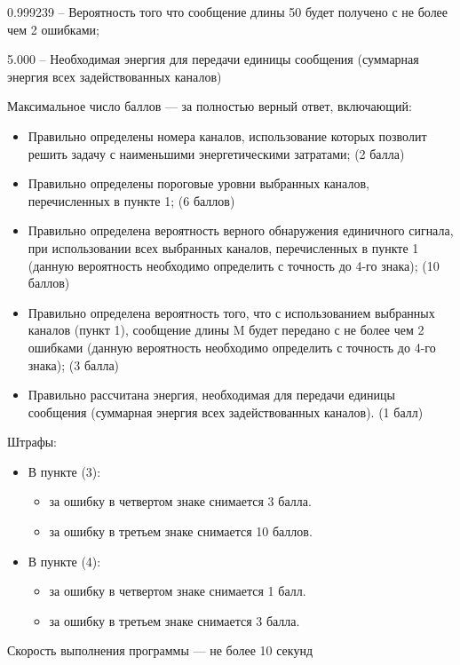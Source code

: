 0.999239 -- Вероятность того что сообщение длины 50 будет получено с не более чем 2 ошибками;

5.000 -- Необходимая энергия для передачи единицы сообщения (суммарная энергия всех задействованных каналов)

\markSection

Максимальное число баллов — за полностью верный ответ, включающий:

\begin{itemize}
    \item Правильно определены номера каналов, использование которых позволит решить задачу с наименьшими энергетическими затратами; (2 балла)
    \item Правильно определены пороговые уровни выбранных каналов, перечисленных в пункте 1; (6 баллов)
    \item Правильно определена вероятность верного обнаружения единичного сигнала, при использовании всех выбранных каналов, перечисленных в пункте 1 (данную вероятность необходимо определить с точность до 4-го знака); (10 баллов)
    \item Правильно определена вероятность того, что с использованием выбранных каналов (пункт 1), сообщение длины M будет передано с не более чем 2 ошибками (данную вероятность необходимо определить с точность до 4-го знака); (3 балла)
    \item Правильно рассчитана энергия, необходимая для передачи единицы сообщения (суммарная энергия всех задействованных каналов). (1 балл)
\end{itemize}

Штрафы:
\begin{itemize}
    \item В пункте (3):
    \begin{itemize}
        \item за ошибку в четвертом знаке снимается 3 балла.
        \item за ошибку в третьем знаке снимается 10 баллов.
    \end{itemize}
    \item В пункте (4):
    \begin{itemize}
        \item за ошибку в четвертом знаке снимается 1 балл.
        \item за ошибку в третьем знаке снимается 3 балла.
    \end{itemize}
\end{itemize}

Скорость выполнения программы — не более 10 секунд

